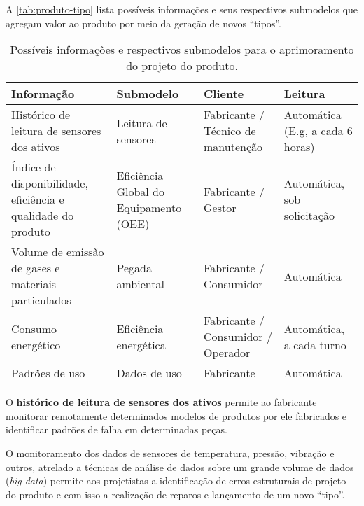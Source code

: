 	A \autoref{tab:produto-tipo} lista possíveis informações e seus respectivos submodelos que agregam valor ao produto por meio da geração de novos ``tipos''.
	
	\begin{table}[htb]
		\centering
		\caption{Possíveis informações e respectivos submodelos para o aprimoramento do projeto do produto.}
		\label{tab:produto-tipo}
		\begin{tabular}{p{4cm}p{3cm}p{3cm}p{4cm}}
			
			\hline
			\textbf{Informação}
			& \textbf{Submodelo}
			& \textbf{Cliente}
			& \textbf{Leitura}	
			\\ 
			
			\hline
			Histórico de leitura de sensores dos ativos
			& Leitura de sensores
			& Fabricante / Técnico de manutenção
			& Automática (E.g, a cada 6 horas)
			\\
			
			\hline
			Índice de disponibilidade, eficiência e qualidade do produto
			& Eficiência Global do Equipamento (OEE)
			& Fabricante / Gestor
			& Automática, sob solicitação
			\\
			
			\hline
			Volume de emissão de gases e materiais particulados
			& Pegada ambiental
			& Fabricante / Consumidor
			& Automática
			\\
			
			\hline
			Consumo energético
			& Eficiência energética
			& Fabricante / Consumidor / Operador
			& Automática, a cada turno
			\\
			
			\hline
			Padrões de uso
			& Dados de uso
			& Fabricante
			& Automática
			\\

			\hline
		\end{tabular}
	\end{table}

	O \textbf{histórico de leitura de sensores dos ativos} permite ao fabricante monitorar remotamente determinados modelos de produtos por ele fabricados e identificar padrões de falha em determinadas peças.
	
	O monitoramento dos dados de sensores de temperatura, pressão, vibração e outros, atrelado a técnicas de análise de dados sobre um grande volume de dados (\textit{big data}) permite aos projetistas a identificação de erros estruturais de projeto do produto e com isso a realização de reparos e lançamento de um novo ``tipo''.
	
